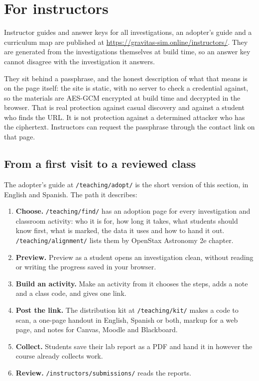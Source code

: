 \documentclass[11pt,a4paper]{article}
\newcommand{\ui}[1]{\textsf{#1}}
\begin{document}
\section{For instructors}

Instructor guides and answer keys for all \GravInvestigations{} investigations,
an adopter's guide and a curriculum map are published at
\url{https://gravitas-sim.online/instructors/}. They are generated from the
investigations themselves at build time, so an answer key cannot disagree with the
investigation it answers.

They sit behind a passphrase, and the honest description of what that means is on
the page itself: the site is static, with no server to check a credential
against, so the materials are AES-GCM encrypted at build time and decrypted in
the browser. That is real protection against casual discovery and against a
student who finds the URL. It is not protection against a determined attacker who
has the ciphertext. Instructors can request the passphrase through the contact
link on that page.

\subsection{From a first visit to a reviewed class}

The adopter's guide at \texttt{/teaching/adopt/} is the short version of this
section, in English and Spanish. The path it describes:

\begin{enumerate}
  \item \textbf{Choose.} \texttt{/teaching/find/} has an adoption page for every
  investigation and classroom activity: who it is for, how long it takes, what
  students should know first, what is marked, the data it uses and how to hand it
  out. \texttt{/teaching/alignment/} lists them by OpenStax Astronomy 2e chapter.
  \item \textbf{Preview.} \ui{Preview as a student} opens an investigation clean,
  without reading or writing the progress saved in your browser.
  \item \textbf{Build an activity.} \ui{Make an activity from it} chooses the
  steps, adds a note and a class code, and gives one link.
  \item \textbf{Post the link.} The distribution kit at \texttt{/teaching/kit/}
  makes a code to scan, a one-page handout in English, Spanish or both, markup
  for a web page, and notes for Canvas, Moodle and Blackboard.
  \item \textbf{Collect.} Students save their lab report as a PDF and hand it in
  however the course already collects work.
  \item \textbf{Review.} \texttt{/instructors/submissions/} reads the reports.
\end{enumerate}
\end{document}
